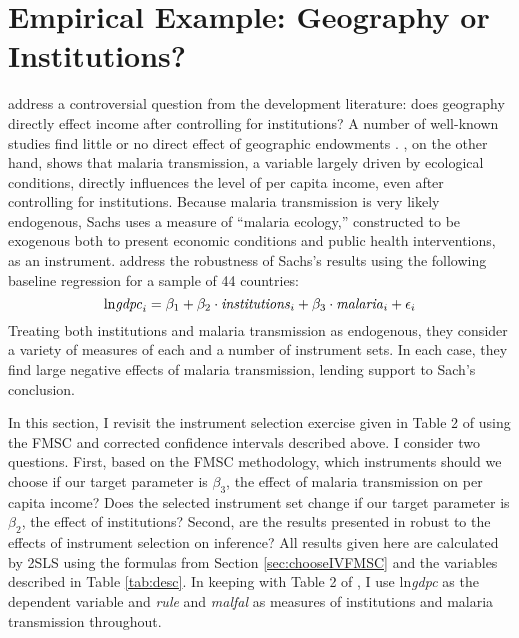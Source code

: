 \section{Empirical Example: Geography or Institutions?}
\label{sec:application}
\cite{Carstensen2006} address a controversial question from the development literature: does geography directly effect income after controlling for institutions? 
A number of well-known studies find little or no direct effect of geographic endowments \citep{Acemoglu,Rodrik,Easterly}. \cite{Sachs}, on the other hand, shows that malaria transmission, a variable largely driven by ecological conditions, directly influences the level of per capita income, even after controlling for institutions. Because malaria transmission is very likely endogenous, Sachs uses a measure of ``malaria ecology,'' constructed to be exogenous both to present economic conditions and public health interventions, as an instrument. 
\cite{Carstensen2006} address the robustness of Sachs's results using the following baseline regression for a sample of 44 countries:
\begin{equation}
	\mbox{ln\emph{gdpc}}_i = \beta_1 + \beta_2 \cdot \mbox{\emph{institutions}}_i + \beta_3 \cdot \mbox{\emph{malaria}}_i + \epsilon_i
\end{equation}
Treating both institutions and malaria transmission as endogenous, they consider a variety of measures of each and a number of instrument sets. 
In each case, they find large negative effects of malaria transmission, lending support to Sach's conclusion.

In this section, I revisit the instrument selection exercise given in Table 2 of \cite{Carstensen2006} using the FMSC and corrected confidence intervals described above. I consider two questions. 
First, based on the FMSC methodology, which instruments should we choose if our target parameter is $\beta_3$, the effect of malaria transmission on per capita income?
Does the selected instrument set change if our target parameter is $\beta_2$, the effect of institutions?
Second, are the results presented in \cite{Carstensen2006} robust to the effects of instrument selection on inference?
All results given here are calculated by 2SLS using the formulas from Section \ref{sec:chooseIVFMSC} and the variables described in Table \ref{tab:desc}. 
In keeping with Table 2 of \cite{Carstensen2006}, I use ln\emph{gdpc} as the dependent variable and \emph{rule} and \emph{malfal} as measures of institutions and malaria transmission throughout.


